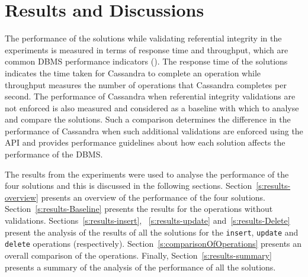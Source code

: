 \chapter{Results and Discussions}


The performance of the solutions while validating referential integrity in the
experiments is measured in terms of response time and throughput,  which are
common \ac{DBMS} performance indicators (). 
The response time of the solutions indicates the time taken for Cassandra to
complete an operation while throughput measures the number of operations that
Cassandra completes per second. 
The performance of Cassandra when referential integrity validations are not
enforced is also measured and considered as a baseline with which to analyse and
compare the solutions.  Such a comparison determines the difference in the
performance of Cassandra when such additional validations are enforced using
the \ac{API} and provides performance guidelines about how each solution affects
the performance of the \ac{DBMS}. 

 The results from the experiments were used to
analyse the performance of the four solutions  and this is discussed in the
following sections. 
Section~\ref{s:results-overview} presents an overview of the  performance of the
four solutions. 
Section~\ref{s:results-Baseline} presents the results for the operations
without validations. 
Sections~\ref{s:results-insert}, ~\ref{s:results-update}
and~\ref{s:results-Delete} present the analysis  of the results
of all the solutions for the \texttt{insert},  \texttt{update} and
\texttt{delete} operations (respectively).  
Section~\ref{s:comparisonOfOperations} presents an overall comparison of the
operations. 
 Finally,  Section~\ref{s:results-summary} presents a summary of the
analysis of the performance of all the solutions. 

\newcommand{\Width}{0.5\textwidth}
\newcommand{\TB}[1]{\textbf{#1}} 




 




